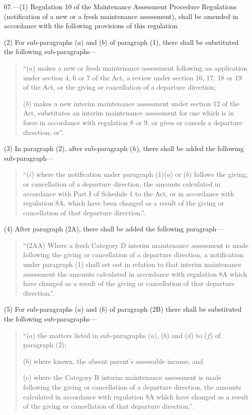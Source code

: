 \documentclass[a4paper]{article}
\begin{document}
67.—(1) Regulation 10 of the Maintenance Assessment Procedure
Regulations (notification of a new or a fresh maintenance assessment), shall be
amended in accordance with the following provisions of this regulation.

(2) For sub-paragraphs ($a$) and ($b$) of paragraph (1), there shall be substituted
the following sub-paragraphs—
\begin{quotation}
“($a$) makes a new or fresh maintenance assessment following an application under
section 4, 6 or 7 of the Act, a review under section 16, 17, 18 or 19 of the
Act, or the giving or cancellation of a departure direction;

($b$) makes a new interim maintenance assessment under section 12 of the Act,
substitutes an interim maintenance assessment for one which is in force in
accordance with regulation 8 or 9, or gives or cancels a departure direction;
or”.
\end{quotation}

(3) In paragraph (2), after sub-paragraph ($h$), there shall be added the
following sub-paragraph—
\begin{quotation}
“($i$) where the notification under paragraph (1)($a$) or ($b$) follows the giving, or
cancellation of a departure direction, the amounts calculated in accordance with
Part I of Schedule 1 to the Act, or in accordance with regulation 8A, which have
been changed as a result of the giving or cancellation of that departure
direction.”.
\end{quotation}

(4) After paragraph (2A), there shall be added the following paragraph—
\begin{quotation}
“(2AA) Where a fresh Category D interim maintenance assessment is made following
the giving or cancellation of a departure direction, a notification under
paragraph (1) shall set out in relation to that interim maintenance assessment
the amounts calculated in accordance with regulation 8A which have changed as a
result of the giving or cancellation of that departure direction.”.
\end{quotation}

(5) For sub-paragraphs ($a$) and ($b$) of paragraph (2B) there shall be substituted
the following sub-paragraphs—
\begin{quotation}
“($a$) the matters listed in sub-paragraphs ($a$), ($b$) and ($d$) to ($f$) of paragraph
(2);

($b$) where known, the absent parent’s assessable income; and

($c$) where the Category B interim maintenance assessment is made following the
giving or cancellation of a departure direction, the amounts calculated in
accordance with regulation 8A which have changed as a result of the giving or
cancellation of that departure direction.”.
\end{quotation}
\end{document}

